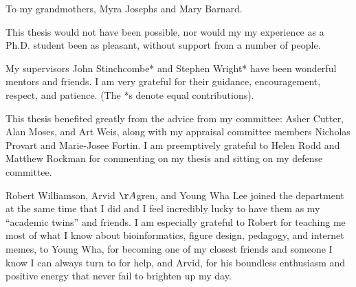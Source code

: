 \documentclass{ut-thesis}
\begin{document}
\begin{preliminary}
\begin{dedication}
To my grandmothers, Myra Josephs and Mary Barnard.
\end{dedication}

\newpage  %


\begin{acknowledgements}

This thesis would not have been possible, nor would my my experience as a Ph.D. student been as pleasant, without support from a number of people.

My supervisors John Stinchcombe* and Stephen Wright* have been wonderful mentors and friends. I am very grateful for their guidance, encouragement, respect, and patience. (The *s denote equal contributions).

This thesis benefited greatly from the advice from my committee: Asher Cutter, Alan Moses, and Art Weis, along with my appraisal committee members Nicholas Provart and Marie-Josee Fortin. I am preemptively grateful to Helen Rodd and Matthew Rockman for commenting on my thesis and sitting on my defense committee.

Robert Williamson, Arvid $\AA$gren, and Young Wha Lee joined the department at the same time that I did and I feel incredibly lucky to have them as my “academic twins” and friends. I am especially grateful to Robert for teaching me most of what I know about bioinformatics, figure design, pedagogy, and internet memes, to Young Wha, for becoming one of my closest friends and someone I know I can always turn to for help, and Arvid, for his boundless enthusiasm and positive energy that never fail to brighten up my day.


\end{acknowledgements}
\end{preliminary}
\end{document}
